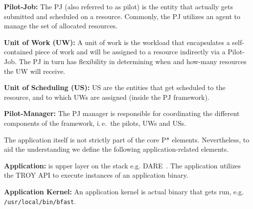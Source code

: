 \documentclass[conference,final]{IEEEtran}
\newcommand{\jhanote}[1]{ {\textcolor{red} { ***shantenu: #1 }}}
\newcommand{\alnote}[1]{ {\textcolor{blue} { ***andre: #1 }}}
\newcommand{\alnote}[1]{}
\newcommand{\jhanote}[1]{}
\begin{document}
\begin{compactitem}
\item \textbf{Pilot-Job:} The PJ (also referred to as pilot) is the
  entity that actually gets submitted and scheduled on a resource. 
  Commonly, the PJ utilizes an agent to manage the
  set of allocated resources.

\item \textbf{Unit of Work (UW):} A unit of work is the workload that
  encapsulates a self-contained piece of work and will be assigned to
  a resource indirectly via a Pilot-Job.  The PJ in turn has
  flexibility in determining when and how-many resources the UW will
  receive.

\item \textbf{Unit of Scheduling (US):} US are the entities 
  that get scheduled to the resource, and to which UWs are assigned
  (inside the PJ framework). 
  



\item \textbf{Pilot-Manager:} The PJ manager is responsible for coordinating
	  the different components of the framework, i.\,e.\ the pilots, UWs and 
	  USs.
\end{compactitem}
The application itself is not strictly part of the core P* elements. Nevertheless, to aid the understanding we define the following application-related elements.
\begin{compactitem}
\item \textbf{Application:} is upper layer on the stack
  e.g. DARE~\cite{dare-tg11}. The application utilizes the TROY API to execute
  instances of an application binary. \label{application}

\item \textbf{Application Kernel:} An application kernel is actual
  binary that gets run, e.g. \texttt{/usr/local/bin/bfast}.
\end{compactitem}	
\end{document}
